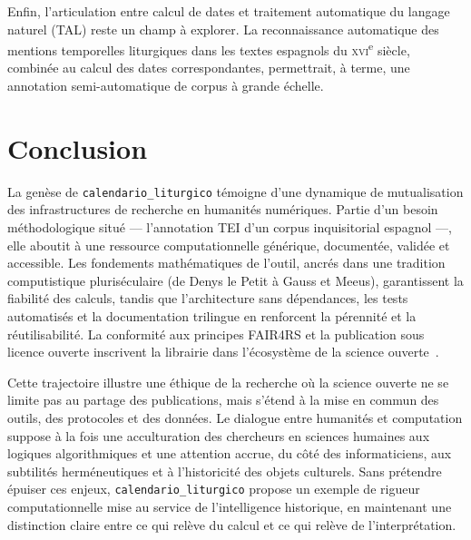 \documentclass[final, fra]{anthology-ch}     %
\begin{document}
Enfin, l'articulation entre calcul de dates et traitement automatique du langage naturel (TAL) reste un champ à explorer. La reconnaissance automatique des mentions temporelles liturgiques dans les textes espagnols du \textsc{xvi}\textsuperscript{e} siècle, combinée au calcul des dates correspondantes, permettrait, à terme, une annotation semi-automatique de corpus à grande échelle.
\section{Conclusion} \label{sec:conclusion}

La genèse de \texttt{calendario\_liturgico} témoigne d'une dynamique de mutualisation des infrastructures de recherche en humanités numériques. Partie d'un besoin méthodologique situé — l'annotation TEI d'un corpus inquisitorial espagnol —, elle aboutit à une ressource computationnelle générique, documentée, validée et accessible. Les fondements mathématiques de l'outil, ancrés dans une tradition computistique pluriséculaire (de Denys le Petit à Gauss et Meeus), garantissent la fiabilité des calculs, tandis que l'architecture sans dépendances, les tests automatisés et la documentation trilingue en renforcent la pérennité et la réutilisabilité. La conformité aux principes FAIR4RS et la publication sous licence ouverte inscrivent la librairie dans l'écosystème de la science ouverte~\cite{chuehong2022}.

Cette trajectoire illustre une éthique de la recherche où la science ouverte ne se limite pas au partage des publications, mais s'étend à la mise en commun des outils, des protocoles et des données. Le dialogue entre humanités et computation suppose à la fois une acculturation des chercheurs en sciences humaines aux logiques algorithmiques et une attention accrue, du côté des informaticiens, aux subtilités herméneutiques et à l'historicité des objets culturels. Sans prétendre épuiser ces enjeux, \texttt{calendario\_liturgico} propose un exemple de rigueur computationnelle mise au service de l'intelligence historique, en maintenant une distinction claire entre ce qui relève du calcul et ce qui relève de l'interprétation.

\printbibliography
\end{document}
